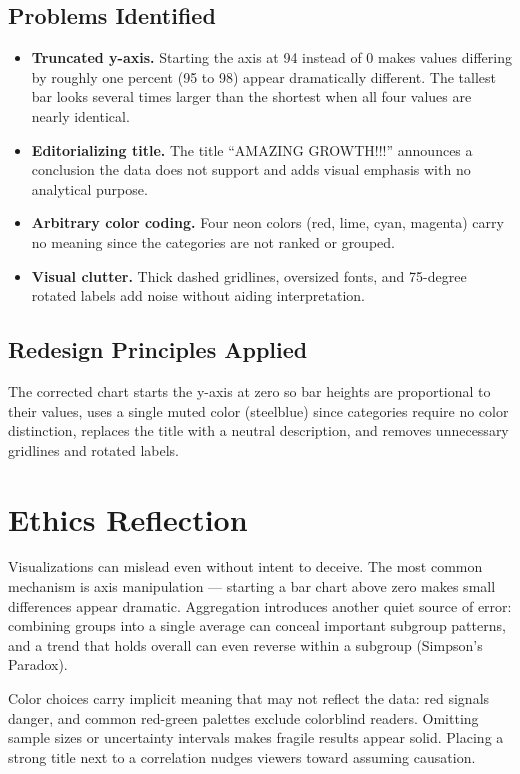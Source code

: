 \documentclass[12pt, letterpaper]{article}
\begin{document}
\subsection*{Problems Identified}
\begin{itemize}
    \item \textbf{Truncated y-axis.} Starting the axis at 94 instead of 0 makes values differing by roughly one percent (95 to 98) appear dramatically different. The tallest bar looks several times larger than the shortest when all four values are nearly identical.
    \item \textbf{Editorializing title.} The title ``AMAZING GROWTH!!!'' announces a conclusion the data does not support and adds visual emphasis with no analytical purpose.
    \item \textbf{Arbitrary color coding.} Four neon colors (red, lime, cyan, magenta) carry no meaning since the categories are not ranked or grouped.
    \item \textbf{Visual clutter.} Thick dashed gridlines, oversized fonts, and 75-degree rotated labels add noise without aiding interpretation.
\end{itemize}

\subsection*{Redesign Principles Applied}
The corrected chart starts the y-axis at zero so bar heights are proportional to their values, uses a single muted color (steelblue) since categories require no color distinction, replaces the title with a neutral description, and removes unnecessary gridlines and rotated labels.

\section{Ethics Reflection}

Visualizations can mislead even without intent to deceive. The most common mechanism is axis manipulation --- starting a bar chart above zero makes small differences appear dramatic. Aggregation introduces another quiet source of error: combining groups into a single average can conceal important subgroup patterns, and a trend that holds overall can even reverse within a subgroup (Simpson's Paradox).

Color choices carry implicit meaning that may not reflect the data: red signals danger, and common red-green palettes exclude colorblind readers. Omitting sample sizes or uncertainty intervals makes fragile results appear solid. Placing a strong title next to a correlation nudges viewers toward assuming causation.
\end{document}
